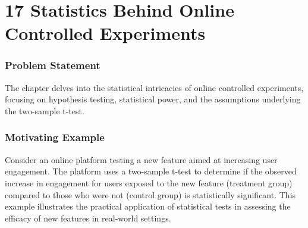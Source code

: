 \documentclass{article}
\begin{document}
\section*{17 Statistics Behind Online Controlled Experiments}
\subsubsection*{Problem Statement}
The chapter delves into the statistical intricacies of online controlled experiments, focusing on hypothesis testing, statistical power, and the assumptions underlying the two-sample t-test.

\subsubsection*{Motivating Example}
Consider an online platform testing a new feature aimed at increasing user engagement. The platform uses a two-sample t-test to determine if the observed increase in engagement for users exposed to the new feature (treatment group) compared to those who were not (control group) is statistically significant. This example illustrates the practical application of statistical tests in assessing the efficacy of new features in real-world settings.
\end{document}
